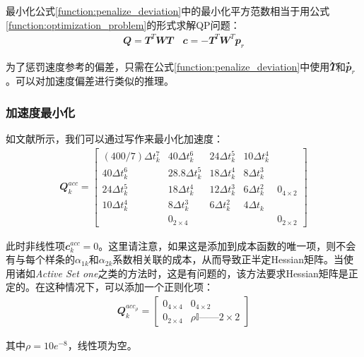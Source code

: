 最小化公式\ref{function:penalize_deviation}中的最小化平方范数相当于用公式\ref{function:optimization_problem}的形式求解QP问题：
\begin{align}
    \mathbfit{Q}=\mathbfit{T}^T\mathbfit{W}\mathbfit{T} \quad \mathbfit{c}=-\mathbfit{T}^T\mathbfit{W}^T\mathbfit{p}_r
\end{align}

为了惩罚速度参考的偏差，只需在公式\ref{function:penalize_deviation}中使用̇$\mathbfit{\dot T}$和̇$\mathbfit{\dot p}_r$。可以对加速度偏差进行类似的推理。

\subsubsection{加速度最小化}
如文献\cite[p]{Kalakrishnan_Buchli_Pastor_Mistry_Schaal_2010}所示，我们可以通过写作来最小化加速度：
\begin{align}
    \label{function:cost_Q_k1}
    {\mathbfit Q}_k^{acc} = 
    \begin{bmatrix}
    (400/7)\Delta t_k^7 & 40\Delta t_k^6 & 24\Delta t_k^5 & 10\Delta t_k^4 & \\
    40\Delta t_k^6 & 28.8\Delta t_k^5 & 18\Delta t_k^4 & 8\Delta t_k^3 & \\
    24\Delta t_k^5 & 18\Delta t_k^4 & 12\Delta t_k^3 & 6\Delta t_k^2 & {\mathbfit 0}_{4\times 2}\\
    10\Delta t_k^4 & 8\Delta t_k^3 & 6\Delta t_k^2 & 4\Delta t_k &\\
     & {\mathbfit 0}_{2\times 4} & & & {\mathbfit 0}_{2\times 2}
    \end{bmatrix}
\end{align}

此时非线性项$\mathbfit{c}_k^{acc}=0$。这里请注意，如果这是添加到成本函数的唯一项，则不会有与每个样条的$\alpha_{1k}$和$\alpha_{2k}$系数相关联的成本，从而导致正半定Hessian矩阵。当使用诸如\emph{Active Set one}\cite[p]{Goldfarb_Idnani_1983}之类的方法时，这是有问题的，该方法要求Hessian矩阵是正定的。在这种情况下，可以添加一个正则化项：
\begin{align}
    \label{function:cost_Q_k2}
    \mathbfit{Q}_k^{acc_{\rho}}=\begin{bmatrix}
        0_{4\times4} & 0_{4\times2}\\
        0_{2\times4} & \rho \mathbb{I}——{2\times2}
    \end{bmatrix}
\end{align}

其中$\rho=10e^{{-8}}$，线性项为空。

